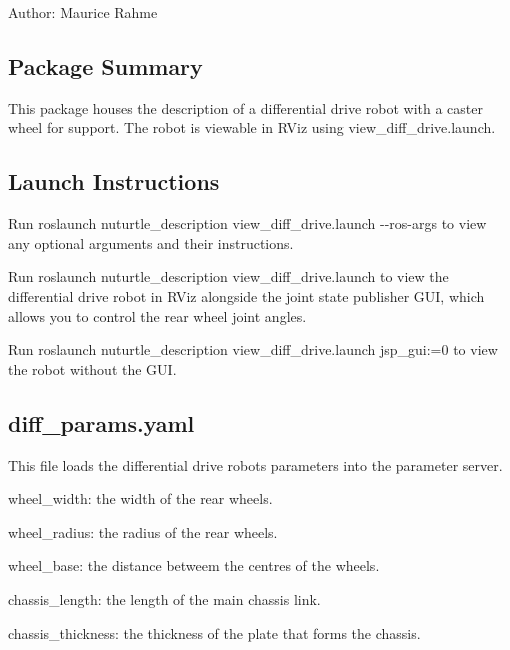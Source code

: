 Author\+: Maurice Rahme

\subsection*{Package Summary}

This package houses the description of a differential drive robot with a caster wheel for support. The robot is viewable in {\ttfamily R\+Viz} using {\ttfamily view\+\_\+diff\+\_\+drive.\+launch}.



\subsection*{Launch Instructions}

Run {\ttfamily roslaunch nuturtle\+\_\+description view\+\_\+diff\+\_\+drive.\+launch -\/-\/ros-\/args} to view any optional arguments and their instructions.

Run {\ttfamily roslaunch nuturtle\+\_\+description view\+\_\+diff\+\_\+drive.\+launch} to view the differential drive robot in R\+Viz alongside the joint state publisher G\+UI, which allows you to control the rear wheel joint angles.

Run {\ttfamily roslaunch nuturtle\+\_\+description view\+\_\+diff\+\_\+drive.\+launch jsp\+\_\+gui\+:=0} to view the robot without the G\+UI.

\subsection*{diff\+\_\+params.\+yaml}

This file loads the differential drive robot\textquotesingle{}s parameters into the parameter server.


\begin{DoxyItemize}
\item {\ttfamily wheel\+\_\+width}\+: the width of the rear wheels.
\item {\ttfamily wheel\+\_\+radius}\+: the radius of the rear wheels.
\item {\ttfamily wheel\+\_\+base}\+: the distance betweem the centres of the wheels.
\item {\ttfamily chassis\+\_\+length}\+: the length of the main chassis link.
\item {\ttfamily chassis\+\_\+thickness}\+: the thickness of the plate that forms the chassis.
\end{DoxyItemize}

